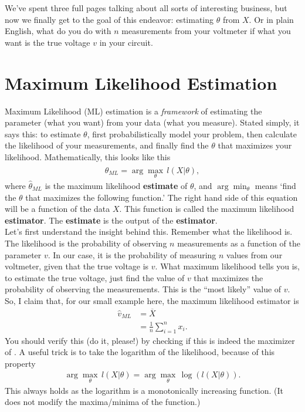 \documentclass[10pt,letterpaper]{article}
\begin{document}
We've spent three full pages talking about all sorts of interesting business, but now we finally get to the goal of this endeavor: estimating $\theta$ from $X$. Or in plain English, what do you do with $n$ measurements from your voltmeter if what you want is the true voltage $v$ in your circuit.

\section{Maximum Likelihood Estimation}
Maximum Likelihood (ML) estimation is a \emph{framework} of estimating the parameter (what you want) from your data (what you measure). Stated simply, it says this: to estimate $\theta$, first probabilistically model your problem, then calculate the likelihood of your measurements, and finally find the $\theta$ that maximizes your likelihood. Mathematically, this looks like this
\begin{align}
 	\widehat{\theta}_{ML} = \arg \max_\theta\, l(X\vert\theta),
 \end{align} 
where $\widehat{\theta}_{ML}$ is the maximum likelihood \textbf{estimate} of $\theta$, and $ \arg \min_\theta$ means `find the $\theta$ that maximizes the following function.' The right hand side of this equation will be a function of the data $X$. This function is called the maximum likelihood \textbf{estimator}. The \textbf{estimate} is the output of the \textbf{estimator}.\\

Let's first understand the insight behind this. Remember what the likelihood is. The likelihood is the probability of observing $n$ measurements as a function of the parameter $v$. In our case, it is the probability of measuring $n$ values from our voltmeter, given that the true voltage is $v$. What maximum likelihood tells you is, to estimate the true voltage, just find the value of $v$ that maximizes the probability of observing the measurements. This is the ``most likely'' value of $v$.\\

So, I claim that, for our small example here, the maximum likelihood estimator is
\begin{align}
	\widehat{v}_{ML} &= \overline{X}\\
					 &= \frac{1}{n}\sum_{i=1}^n x_i.
\end{align}
You should verify this (\textsf{do it, please!}) by checking if this is indeed the maximizer of . A useful trick is to take the logarithm of the likelihood, because of this property
\begin{align}
	\arg \max_\theta\, l(X\vert\theta) = \arg \max_\theta\, \log\left(l(X\vert\theta)\right).
\end{align}
This always holds as the logarithm is a monotonically increasing function. (It does not modify the maxima/minima of the function.)\\
\end{document}
